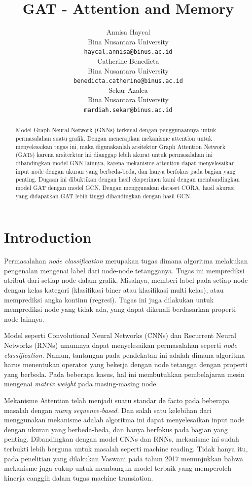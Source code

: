 \documentclass{article}
\title{GAT - Attention and Memory
}
\author{
  Annisa Haycal \\
  Bina Nusantara University \\
  \texttt{haycal.annisa@binus.ac.id} \\
   \And
  Catherine Benedicta \\
  Bina Nusantara University \\
  \texttt{benedicta.catherine@binus.ac.id} \\
  \And
  Sekar Azalea \\
  Bina Nusantara University \\
  \texttt{mardiah.sekar@binus.ac.id}
}
\begin{document}
\maketitle


\begin{abstract}
Model Graph Neural Network (GNNs) terkenal dengan penggunaannya untuk permasalahan suatu grafik. Dengan menerapkan mekanisme attention untuk menyelesaikan tugas ini, maka digunakanlah arsitektur Graph Attention Network (GATs) karena arsiterktur ini dianggap lebih akurat untuk permasalahan ini dibandingkan model GNN lainnya, karena mekanisme attention dapat menyelesaikan input node dengan ukuran yang berbeda-beda, dan hanya berfokus pada bagian yang penting. Dugaan ini dibuktikan dengan hasil eksperimen kami dengan membandingkan model GAT dengan model GCN. Dengan menggunakan dataset CORA, hasil akurasi yang didapatkan GAT lebih tinggi dibandingkan dengan hasil GCN.
\end{abstract}




\section{Introduction}
Permasalahan \textit{node classification} merupakan tugas dimana algoritma melakukan pengenalan mengenai label dari node-node tetangganya. Tugas ini memprediksi atribut dari setiap node dalam grafik. Misalnya, memberi label pada setiap node dengan kelas kategori (klasifikasi biner atau klasifikasi multi kelas), atau memprediksi angka kontinu (regresi). Tugas ini juga dilakukan untuk memprediksi node yang tidak ada, yang dapat dikenali berdasarkan properti node lainnya.

Model seperti Convolutional Neural Networks (CNNs) dan Recurrent Neural Networks (RNNs) umumnya dapat menyelesaikan permasalahan seperti \textit{node classification}. Namun, tantangan pada pendekatan ini adalah dimana algoritma harus menentukan operator yang bekerja dengan node tetangga dengan properti yang berbeda. Pada beberapa kasus, hal ini membutuhkan pembelajaran mesin mengenai \textit{matrix weight} pada masing-masing node.

Mekanisme Attention telah menjadi suatu standar de facto pada beberapa masalah dengan \textit{many sequence-based}. Dan salah satu kelebihan dari menggunakan mekanisme adalah algoritma ini dapat menyelesaikan input node dengan ukuran yang berbeda-beda, dan hanya berfokus pada bagian yang penting. Dibandingkan dengan model CNNs dan RNNs, mekanisme ini sudah terbukti lebih berguna untuk masalah seperti machine reading. Tidak hanya itu, pada penelitian yang dilakukan Vaswani\cite{cite1} pada tahun 2017 menunjukkan bahwa mekanisme juga cukup untuk membangun model terbaik yang memperoleh kinerja canggih dalam tugas machine translation.
\end{document}

